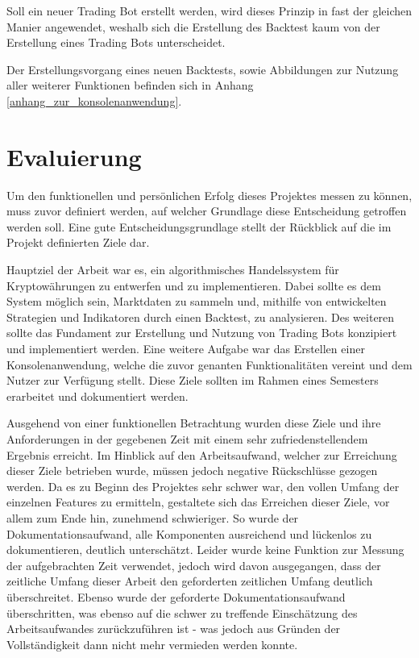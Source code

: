 \documentclass[oneside]{ausarbeitung}
\begin{document}
Soll ein neuer Trading Bot erstellt werden, wird dieses Prinzip in fast der gleichen Manier angewendet, weshalb sich die Erstellung des Backtest kaum von der Erstellung eines Trading Bots unterscheidet. 

Der Erstellungsvorgang eines neuen Backtests, sowie Abbildungen zur Nutzung aller weiterer Funktionen befinden sich in Anhang \ref{anhang_zur_konsolenanwendung}.

\chapter{Evaluierung}

Um den funktionellen und persönlichen Erfolg dieses Projektes messen zu können, muss zuvor definiert werden, auf welcher Grundlage diese Entscheidung getroffen werden soll. Eine gute Entscheidungsgrundlage stellt der Rückblick auf die im Projekt definierten Ziele dar.

Hauptziel der Arbeit war es, ein algorithmisches Handelssystem für Kryptowährungen zu entwerfen und zu implementieren. Dabei sollte es dem System möglich sein, Marktdaten zu sammeln und, mithilfe von entwickelten Strategien und Indikatoren durch einen Backtest, zu analysieren. Des weiteren sollte das Fundament zur Erstellung und Nutzung von Trading Bots konzipiert und implementiert werden. Eine weitere Aufgabe war das Erstellen einer Konsolenanwendung, welche die zuvor genanten Funktionalitäten vereint und dem Nutzer zur Verfügung stellt. Diese Ziele sollten im Rahmen eines Semesters erarbeitet und dokumentiert werden.

Ausgehend von einer funktionellen Betrachtung wurden diese Ziele und ihre Anforderungen in der gegebenen Zeit mit einem sehr zufriedenstellendem Ergebnis erreicht. Im Hinblick auf den Arbeitsaufwand, welcher zur Erreichung dieser Ziele betrieben wurde, müssen jedoch negative Rückschlüsse gezogen werden. Da es zu Beginn des Projektes sehr schwer war, den vollen Umfang der einzelnen Features zu ermitteln, gestaltete sich das Erreichen dieser Ziele, vor allem zum Ende hin, zunehmend schwieriger. So wurde der Dokumentationsaufwand, alle Komponenten ausreichend und lückenlos zu dokumentieren, deutlich unterschätzt. Leider wurde keine Funktion zur Messung der aufgebrachten Zeit verwendet, jedoch wird davon ausgegangen, dass der zeitliche Umfang dieser Arbeit den geforderten zeitlichen Umfang deutlich überschreitet. Ebenso wurde der geforderte Dokumentationsaufwand überschritten, was ebenso auf die schwer zu treffende Einschätzung des Arbeitsaufwandes zurückzuführen ist - was jedoch aus Gründen der Vollständigkeit dann nicht mehr vermieden werden konnte.
\end{document}
